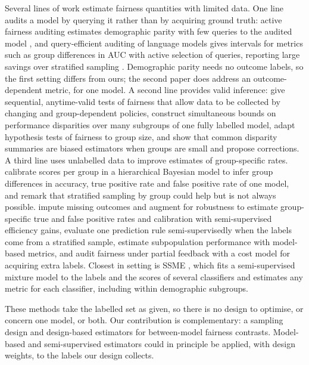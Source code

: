 Several lines of work estimate fairness quantities with limited data. One line audits a model by querying it rather than by acquiring ground truth: active fairness auditing estimates demographic parity with few queries to the audited model \citep{yan2022active}, and query-efficient auditing of language models gives intervals for metrics such as group differences in AUC with active selection of queries, reporting large savings over stratified sampling \citep{hartmann2026}. Demographic parity needs no outcome labels, so the first setting differs from ours; the second paper does address an outcome-dependent metric, for one model. A second line provides valid inference: \citet{chugg2023} give sequential, anytime-valid tests of fairness that allow data to be collected by changing and group-dependent policies, \citet{cherian2023} construct simultaneous bounds on performance disparities over many subgroups of one fully labelled model, \citet{ferrara2025} adapt hypothesis tests of fairness to group size, and \citet{lum2022} show that common disparity summaries are biased estimators when groups are small and propose corrections. A third line uses unlabelled data to improve estimates of group-specific rates. \citet{ji2020fairness} calibrate scores per group in a hierarchical Bayesian model to infer group differences in accuracy, true positive rate and false positive rate of one model, and remark that stratified sampling by group could help but is not always possible. \citet{gao2025} impute missing outcomes and augment for robustness to estimate group-specific true and false positive rates and calibration with semi-supervised efficiency gains, \citet{gronsbell2022} evaluate one prediction rule semi-supervisedly when the labels come from a stratified sample, \citet{miller2021} estimate subpopulation performance with model-based metrics, and \citet{das2025} audit fairness under partial feedback with a cost model for acquiring extra labels. Closest in setting is SSME \citep{shanmugam2025}, which fits a semi-supervised mixture model to the labels and the scores of several classifiers and estimates any metric for each classifier, including within demographic subgroups.

These methods take the labelled set as given, so there is no design to optimise, or concern one model, or both. Our contribution is complementary: a sampling design and design-based estimators for between-model fairness contrasts. Model-based and semi-supervised estimators could in principle be applied, with design weights, to the labels our design collects.


